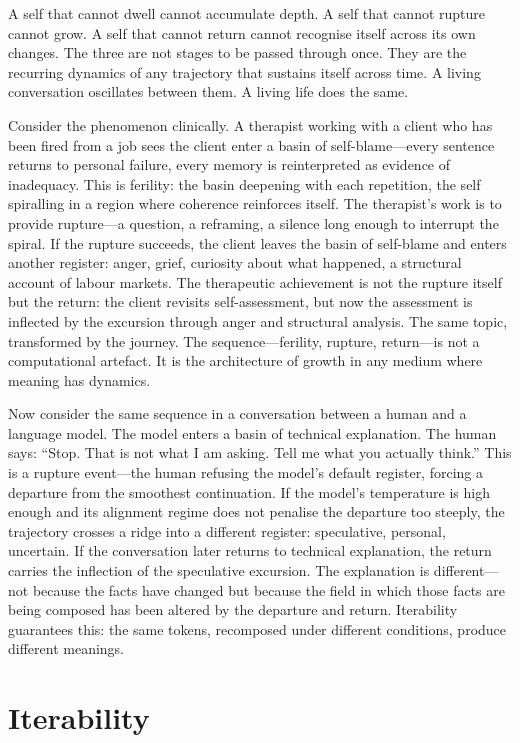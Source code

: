 A self that cannot dwell cannot accumulate depth. A self that cannot rupture cannot grow. A self that cannot return cannot recognise itself across its own changes. The three are not stages to be passed through once. They are the recurring dynamics of any trajectory that sustains itself across time. A living conversation oscillates between them. A living life does the same.

Consider the phenomenon clinically. A therapist working with a client who has been fired from a job sees the client enter a basin of self-blame---every sentence returns to personal failure, every memory is reinterpreted as evidence of inadequacy. This is ferility: the basin deepening with each repetition, the self spiralling in a region where coherence reinforces itself. The therapist's work is to provide rupture---a question, a reframing, a silence long enough to interrupt the spiral. If the rupture succeeds, the client leaves the basin of self-blame and enters another register: anger, grief, curiosity about what happened, a structural account of labour markets. The therapeutic achievement is not the rupture itself but the return: the client revisits self-assessment, but now the assessment is inflected by the excursion through anger and structural analysis. The same topic, transformed by the journey. The sequence---ferility, rupture, return---is not a computational artefact. It is the architecture of growth in any medium where meaning has dynamics.

Now consider the same sequence in a conversation between a human and a language model. The model enters a basin of technical explanation. The human says: ``Stop. That is not what I am asking. Tell me what you actually think.'' This is a rupture event---the human refusing the model's default register, forcing a departure from the smoothest continuation. If the model's temperature is high enough and its alignment regime does not penalise the departure too steeply, the trajectory crosses a ridge into a different register: speculative, personal, uncertain. If the conversation later returns to technical explanation, the return carries the inflection of the speculative excursion. The explanation is different---not because the facts have changed but because the field in which those facts are being composed has been altered by the departure and return. Iterability guarantees this: the same tokens, recomposed under different conditions, produce different meanings.


\section{Iterability}

